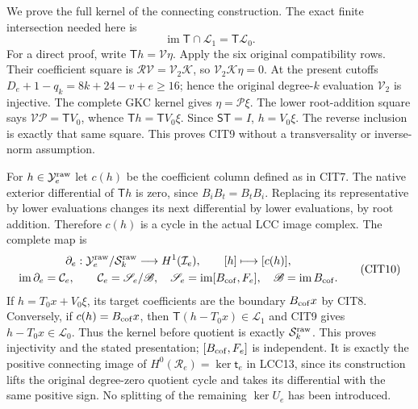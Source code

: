 \documentclass[10pt]{article}
\begin{document}
We prove the full kernel of the connecting construction.
The exact finite intersection needed here is
\[
              \operatorname{im}\mathsf T\cap\mathcal L_1
                            =\mathsf T\mathcal L_0 .
 \tag{CIT9}
\]
For a direct proof, write $\mathsf T h=\mathcal V\eta$.
Apply the six original compatibility rows. Their coefficient
square is $\mathcal R\mathcal V=\mathcal V_2\mathcal K$,
so $\mathcal V_2\mathcal K\eta=0$. At the present cutoffs
$D_e+1-q_k=8k+24-v+e\ge16$; hence the original degree-$k$
evaluation $\mathcal V_2$ is injective. The complete GKC kernel
gives $\eta=\mathcal P\xi$. The lower root-addition square says
$\mathcal V\mathcal P=\mathsf T V_0$, whence
$\mathsf T h=\mathsf T V_0\xi$. Since $\mathsf S\mathsf T=I$,
$h=V_0\xi$. The reverse inclusion is exactly that same square.
This proves CIT9 without a transversality or inverse-norm assumption.

For $h\in\mathcal Y_e^{\rm raw}$ let $c(h)$ be the coefficient
column defined as in CIT7. The native exterior differential of
$\mathsf T h$ is zero, since $B_iB_t=B_tB_i$. Replacing its
representative by lower evaluations changes its next differential
by lower evaluations, by root addition. Therefore $c(h)$ is a
cycle in the actual LCC image complex. The complete map is
\[
 \begin{gathered}
 \partial_e:\mathcal Y_e^{\rm raw}/\mathcal S_k^{\rm raw}
     \longrightarrow H^1(\mathcal I_e),\qquad
          [h]\longmapsto[c(h)],\\
 \operatorname{im}\partial_e=\mathcal C_e,\qquad
 \mathcal C_e=
 \mathscr S_e/\mathscr B,\quad
 \mathscr S_e=\operatorname{im}[B_{\rm cof},F_e],\quad
 \mathscr B=\operatorname{im}B_{\rm cof}.
 \end{gathered}\tag{CIT10}
\]
If $h=T_0x+V_0\xi$, its target coefficients are the boundary
$B_{\rm cof}x$ by CIT8. Conversely, if $c(h)=B_{\rm cof}x$,
then $\mathsf T(h-T_0x)\in\mathcal L_1$ and CIT9 gives
$h-T_0x\in\mathcal L_0$. Thus the kernel before quotient is
exactly $\mathcal S_k^{\rm raw}$. This proves injectivity and
the stated presentation; $[B_{\rm cof},F_e]$ is independent.
It is exactly the positive connecting image of
$H^0(\mathcal R_e)=\ker\mathsf t_e$ in LCC13, since its
construction lifts the original degree-zero quotient cycle
and takes its differential with the same positive sign.
No splitting of the remaining $\ker U_e$ has been introduced.
\end{document}
